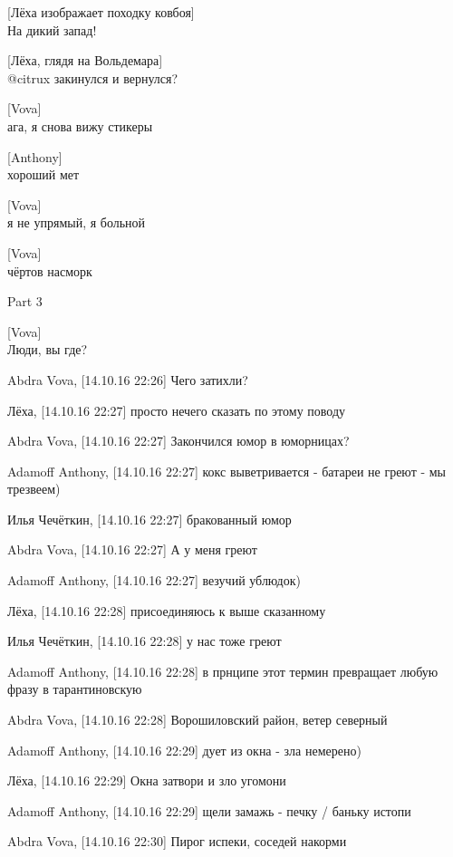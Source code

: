 [Лёха изображает походку ковбоя]\\
На дикий запад!


[Лёха, глядя на Вольдемара]\\
@citrux закинулся и вернулся?


[Vova]\\
ага, я снова вижу стикеры


[Anthony]\\
хороший мет


[Vova]\\
я не упрямый, я больной


[Vova]\\
чёртов насморк


\begin{center}
\large Part 3
\end{center}

{\small{}}

[Vova]\\
Люди, вы где?

Abdra Vova, [14.10.16 22:26]
Чего затихли?

Лёха, [14.10.16 22:27]
просто нечего сказать по этому поводу

Abdra Vova, [14.10.16 22:27]
Закончился юмор в юморницах?

Adamoff Anthony, [14.10.16 22:27]
кокс выветривается - батареи не греют - мы трезвеем)

Илья Чечёткин, [14.10.16 22:27]
бракованный юмор

Abdra Vova, [14.10.16 22:27]
А у меня греют

Adamoff Anthony, [14.10.16 22:27]
везучий ублюдок)

Лёха, [14.10.16 22:28]
присоединяюсь к выше сказанному

Илья Чечёткин, [14.10.16 22:28]
у нас тоже греют

Adamoff Anthony, [14.10.16 22:28]
в прнципе этот термин превращает любую фразу в тарантиновскую

Abdra Vova, [14.10.16 22:28]
Ворошиловский район, ветер северный

Adamoff Anthony, [14.10.16 22:29]
дует из окна - зла немерено)

Лёха, [14.10.16 22:29]
Окна затвори и зло угомони

Adamoff Anthony, [14.10.16 22:29]
щели замажь - печку / баньку истопи

Abdra Vova, [14.10.16 22:30]
Пирог испеки, соседей накорми


